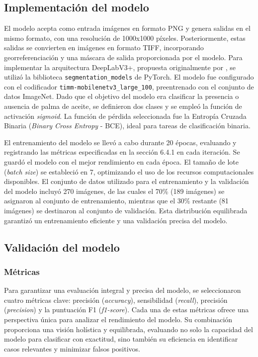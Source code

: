 \subsection{Implementación del modelo}

El modelo acepta como entrada imágenes en formato PNG y genera salidas en el mismo formato, con una resolución de 1000x1000 píxeles. Posteriormente, estas salidas se convierten en imágenes en formato TIFF, incorporando georreferenciación y una máscara de salida proporcionada por el modelo. Para implementar la arquitectura DeepLabV3+, propuesta originalmente por \cite{chen2018}, se utilizó la biblioteca \texttt{segmentation\_models} de PyTorch. El modelo fue configurado con el codificador \texttt{timm-mobilenetv3\_large\_100}, preentrenado con el conjunto de datos ImageNet. Dado que el objetivo del modelo era clasificar la presencia o ausencia de palma de aceite, se definieron dos clases y se empleó la función de activación \textit{sigmoid}. La función de pérdida seleccionada fue la Entropía Cruzada Binaria (\textit{Binary Cross Entropy} - BCE), ideal para tareas de clasificación binaria.

El entrenamiento del modelo se llevó a cabo durante 20 épocas, evaluando y registrando las métricas especificadas en la sección 6.4.1 en cada iteración. Se guardó el modelo con el mejor rendimiento en cada época. El tamaño de lote (\textit{batch size}) se estableció en 7, optimizando el uso de los recursos computacionales disponibles. El conjunto de datos utilizado para el entrenamiento y la validación del modelo incluyó 270 imágenes, de las cuales el 70\% (189 imágenes) se asignaron al conjunto de entrenamiento, mientras que el 30\% restante (81 imágenes) se destinaron al conjunto de validación. Esta distribución equilibrada garantizó un entrenamiento eficiente y una validación precisa del modelo.

\subsection{Validación del modelo}

\subsubsection{Métricas}

Para garantizar una evaluación integral y precisa del modelo, se seleccionaron cuatro métricas clave: precisión (\textit{accuracy}), sensibilidad (\textit{recall}), precisión (\textit{precision}) y la puntuación F1 (\textit{f1-score}). Cada una de estas métricas ofrece una perspectiva única para analizar el rendimiento del modelo. Su combinación proporciona una visión holística y equilibrada, evaluando no solo la capacidad del modelo para clasificar con exactitud, sino también su eficiencia en identificar casos relevantes y minimizar falsos positivos.

